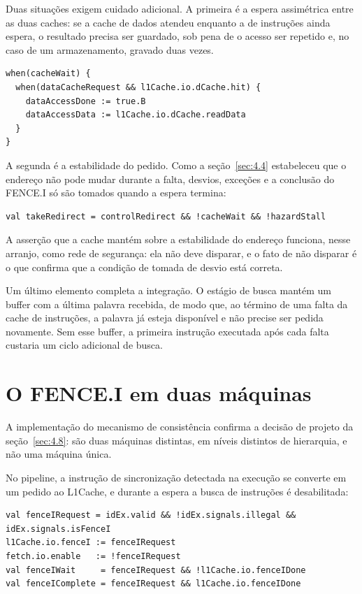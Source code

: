 Duas situações exigem cuidado adicional. A primeira é a espera assimétrica entre as duas caches: se a cache de dados atendeu enquanto a de instruções ainda espera, o resultado precisa ser guardado, sob pena de o acesso ser repetido e, no caso de um armazenamento, gravado duas vezes.


{\footnotesize
\begin{verbatim}
when(cacheWait) {
  when(dataCacheRequest && l1Cache.io.dCache.hit) {
    dataAccessDone := true.B
    dataAccessData := l1Cache.io.dCache.readData
  }
}
\end{verbatim}
}


A segunda é a estabilidade do pedido. Como a seção~\ref{sec:4.4} estabeleceu que o endereço não pode mudar durante a falta, desvios, exceções e a conclusão do FENCE.I só são tomados quando a espera termina:


{\footnotesize
\begin{verbatim}
val takeRedirect = controlRedirect && !cacheWait && !hazardStall
\end{verbatim}
}


A asserção que a cache mantém sobre a estabilidade do endereço funciona, nesse arranjo, como rede de segurança: ela não deve disparar, e o fato de não disparar é o que confirma que a condição de tomada de desvio está correta.

Um último elemento completa a integração. O estágio de busca mantém um buffer com a última palavra recebida, de modo que, ao término de uma falta da cache de instruções, a palavra já esteja disponível e não precise ser pedida novamente. Sem esse buffer, a primeira instrução executada após cada falta custaria um ciclo adicional de busca.

\section{O FENCE.I em duas máquinas}\label{sec:5.8}

A implementação do mecanismo de consistência confirma a decisão de projeto da seção~\ref{sec:4.8}: são duas máquinas distintas, em níveis distintos de hierarquia, e não uma máquina única.

No pipeline, a instrução de sincronização detectada na execução se converte em um pedido ao L1Cache, e durante a espera a busca de instruções é desabilitada:


{\footnotesize
\begin{verbatim}
val fenceIRequest = idEx.valid && !idEx.signals.illegal && idEx.signals.isFenceI
l1Cache.io.fenceI := fenceIRequest
fetch.io.enable   := !fenceIRequest
val fenceIWait     = fenceIRequest && !l1Cache.io.fenceIDone
val fenceIComplete = fenceIRequest && l1Cache.io.fenceIDone
\end{verbatim}
}


